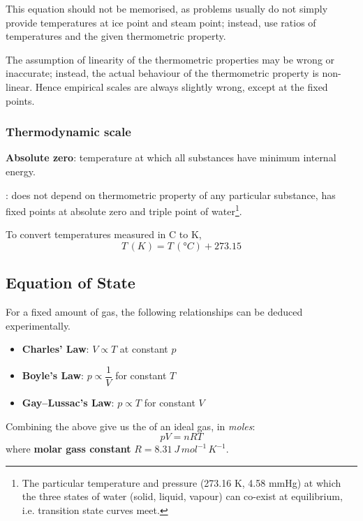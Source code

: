 \begin{remark}
This equation should not be memorised, as problems usually do not simply provide temperatures at ice point and steam point; instead, use ratios of temperatures and the given thermometric property.
\end{remark}

\begin{remark}
The assumption of linearity of the thermometric properties may be wrong or inaccurate; instead, the actual behaviour of the thermometric property is non-linear. Hence empirical scales are always slightly wrong, except at the fixed points.
\end{remark}

\subsubsection{Thermodynamic scale}
\textbf{Absolute zero}: temperature at which all substances have minimum internal energy.

: does not depend on thermometric property of any particular substance, has fixed points at absolute zero and triple point of water\footnote{The particular temperature and pressure (273.16 K, 4.58 mmHg) at which the three states of water (solid, liquid, vapour) can co-exist at equilibrium, i.e. transition state curves meet.}.

To convert temperatures measured in \degree C to K,
\[ T\,(\unit{K}) = T\,(\unit{\degree C}) + 273.15 \]
\pagebreak

\subsection{Equation of State}
For a fixed amount of gas, the following relationships can be deduced experimentally.
\begin{itemize}
\item \textbf{Charles' Law}: $V \propto T$ at constant $p$
\item \textbf{Boyle's Law}: $p \propto \dfrac{1}{V}$ for constant $T$
\item \textbf{Gay--Lussac's Law}: $p \propto T$ for constant $V$
\end{itemize}

Combining the above give us the  of an ideal gas, in \emph{moles}:
\begin{equation}
pV=nRT
\end{equation}
where \textbf{molar gass constant} $R=8.31\:\unit{J\,mol^{-1}\,K^{-1}}$.

